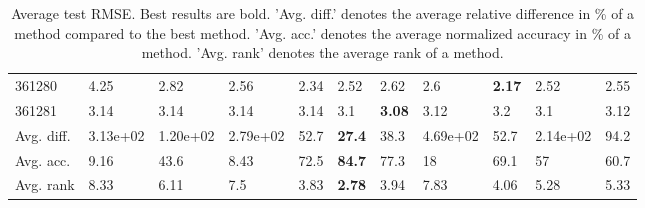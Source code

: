 \begin{table}[ht!]
\begin{tabular}{lllllllllll}
  361280 & 4.25 & 2.82 & 2.56 & 2.34 & 2.52 & 2.62 & 2.6 & \textbf{2.17} & 2.52 & 2.55 \\ 
  361281 & 3.14 & 3.14 & 3.14 & 3.14 & 3.1 & \textbf{3.08} & 3.12 & 3.2 & 3.1 & 3.12 \\ 
   \hline
Avg. diff. & 3.13e+02 & 1.20e+02 & 2.79e+02 & 52.7 & \textbf{27.4} & 38.3 & 4.69e+02 & 52.7 & 2.14e+02 & 94.2 \\ 
  Avg. acc. & 9.16 & 43.6 & 8.43 & 72.5 & \textbf{84.7} & 77.3 & 18 & 69.1 & 57 & 60.7 \\ 
  Avg. rank & 8.33 & 6.11 & 7.5 & 3.83 & \textbf{2.78} & 3.94 & 7.83 & 4.06 & 5.28 & 5.33 \\ 
   \hline
\hline
\end{tabular}
\endgroup
\caption{Average test RMSE. 
                  Best results are bold. 
                  'Avg. diff.' denotes the average relative difference in \% of a method compared to the best method.
                  'Avg. acc.' denotes the average normalized accuracy in \% of a method.
                  'Avg. rank' denotes the average rank of a method.} 
\label{TABLES/table_results_RMSE_mahalanobis}
\end{table}
